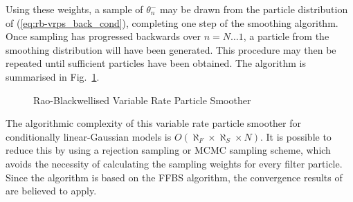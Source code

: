 \documentclass[10pt,twocolumn,twoside]{IEEEtran}
\begin{document}
Using these weights, a sample of $\theta_{n}^-$ may be drawn from the particle distribution of (\ref{eq:rb-vrps_back_cond}), completing one step of the smoothing algorithm. Once sampling has progressed backwards over $n=N \dots 1$, a particle from the smoothing distribution will have been generated. This procedure may then be repeated until sufficient particles have been obtained. The algorithm is summarised in Fig.~\ref{alg:RBVRPS}.

\begin{figure}
\caption{Rao-Blackwellised Variable Rate Particle Smoother}
\label{alg:RBVRPS}
\end{figure}

The algorithmic complexity of this variable rate particle smoother for conditionally linear-Gaussian models is $O(\aleph_F \times \aleph_S \times N)$. It is possible to reduce this by using a rejection sampling \cite{Douc2011} or MCMC \cite{Bunch2012} sampling scheme, which avoids the necessity of calculating the sampling weights for every filter particle. Since the algorithm is based on the FFBS algorithm, the convergence results of \cite{Godsill2004,Douc2011} are believed to apply.
\end{document}
